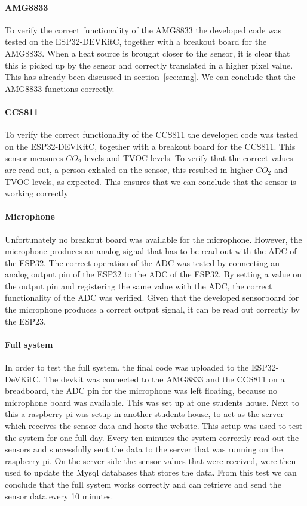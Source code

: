 \documentclass[11pt,a4paper]{article}
\begin{document}
\paragraph{AMG8833}
To verify the correct functionality of the AMG8833 the developed code was tested on the ESP32-DEVKitC, together with a breakout board for the AMG8833. When a heat source is brought closer to the sensor, it is clear that this is picked up by the sensor and correctly translated in a higher pixel value. This has already been discussed in section~\ref{sec:amg}. We can conclude that the AMG8833 functions correctly. 
\paragraph{CCS811}
To verify the correct functionality of the CCS811 the developed code was tested on the ESP32-DEVKitC, together with a breakout board for the CCS811. This sensor measures $CO_2$ levels and TVOC levels. To verify that the correct values are read out, a person exhaled on the sensor, this resulted in higher $CO_2$ and TVOC levels, as expected. This ensures that we can conclude that the sensor is working correctly
\paragraph{Microphone}
Unfortunately no breakout board was available for the microphone. However, the microphone produces an analog signal that has to be read out with the ADC of the ESP32. The correct operation of the ADC was tested by connecting an analog output pin of the ESP32 to the ADC of the ESP32. By setting a value on the output pin and registering the same value with the ADC, the correct functionality of the ADC was verified. Given that the developed sensorboard for the microphone produces a correct output signal, it can be read out correctly by the ESP23. 

\paragraph{Full system}
In order to test the full system, the final code was uploaded to the ESP32-DeVKitC. The devkit was connected to the AMG8833 and the CCS811 on a breadboard, the ADC pin for the microphone was left floating, because no microphone board was available. This was set up at one students house. Next to this a raspberry pi was setup in another students house, to act as the server which receives the sensor data and hosts the website. This setup was used to test the system for one full day. Every ten minutes the system correctly read out the sensors and successfully sent the data to the server that was running on the raspberry pi. On the server side the sensor values that were received, were then used to update the Mysql databases that stores the data. From this test we can conclude that the full system works correctly and can retrieve and send the sensor data every 10 minutes.\\
\end{document}
